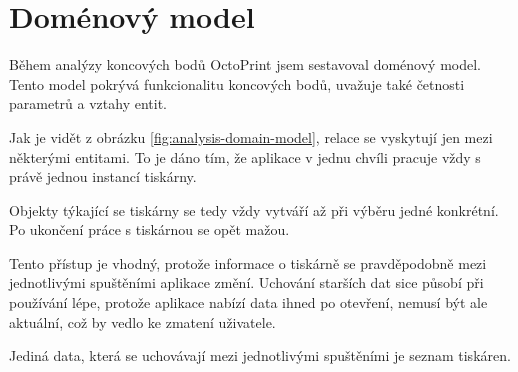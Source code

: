 \section{Doménový model}

Během analýzy koncových bodů OctoPrint jsem sestavoval doménový model.
Tento model pokrývá funkcionalitu koncových bodů, uvažuje také četnosti parametrů a vztahy entit.

Jak je vidět z obrázku \ref{fig:analysis-domain-model}, relace se vyskytují jen mezi některými entitami.
To je dáno tím, že aplikace v jednu chvíli pracuje vždy s právě jednou instancí tiskárny.


Objekty týkající se tiskárny se tedy vždy vytváří až při výběru jedné konkrétní.
Po ukončení práce s tiskárnou se opět mažou.

Tento přístup je vhodný, protože informace o tiskárně se pravděpodobně mezi jednotlivými spuštěními aplikace změní.
Uchování starších dat sice působí při používání lépe, protože aplikace nabízí data ihned po otevření, nemusí být ale aktuální, což by vedlo ke zmatení uživatele.

Jediná data, která se uchovávají mezi jednotlivými spuštěními je seznam tiskáren.
